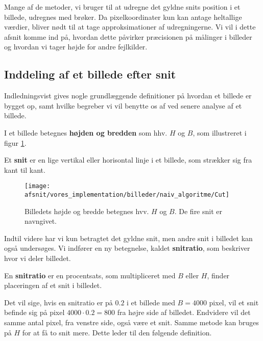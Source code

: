 {
\textsf{
Mange af de metoder, vi bruger til at udregne det gyldne snits position
i et billede, udregnes med brøker. Da pixelkoordinater kun kan antage
heltallige værdier, bliver nødt til at tage approksimationer af
udregningerne. Vi vil i dette afsnit komme ind på, hvordan dette
påvirker præcisionen på målinger i billeder og hvordan vi tager højde
for andre fejlkilder.
}

\subsection{Inddeling af et billede efter snit}
Indledningsvist gives nogle grundlæggende definitioner på hvordan et
billede er bygget op, samt hvilke begreber vi vil benytte os af ved
senere analyse af et billede.

\begin{definition}
	I et billede betegnes \textbf{højden og bredden} som hhv. $H$ og
	$B$, som illustreret i figur \ref{cut}.
\end{definition}

\begin{definition}
    Et \textbf{snit} er en lige vertikal eller horisontal linje i et
    billede, som strækker sig fra kant til kant.
\end{definition}

\begin{figure}[!ht]
    \centering
    \texttt{[image: afsnit/vores\_implementation/billeder/naiv\_algoritme/Cut]}
    \caption[]{Billedets højde og bredde betegnes hvv. $H$ og $B$. De
    fire snit er navngivet.}
    \label{cut}
\end{figure}

Indtil videre har vi kun betragtet det gyldne snit, men andre snit i
billedet kan også undersøges. Vi indfører en ny betegnelse, kaldet
\textbf{snitratio}, som beskriver hvor vi deler billedet.

\begin{definition}
	En \textbf{snitratio} er en procentsats, som multipliceret med $B$ eller
	$H$, finder placeringen af et snit i billedet.
\end{definition}

Det vil sige, hvis en snitratio er på $0.2$ i et billede med $B =
4000$ pixel, vil et snit befinde sig på pixel $4000 \cdot 0.2 = 800$ fra højre side af
billedet. Endvidere vil det samme antal pixel, fra venstre side, også være et snit.
Samme metode kan bruges på $H$ for at få to snit mere. Dette leder til
den følgende definition.

}
